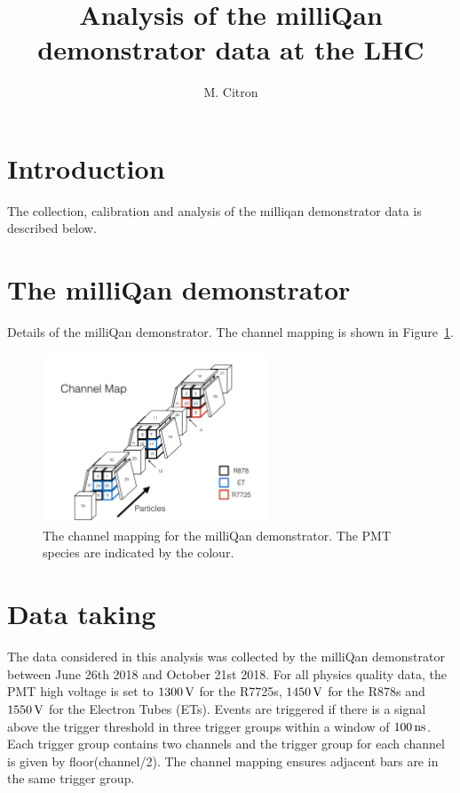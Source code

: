 \documentclass[12pt]{article}
\title{Analysis of the milliQan demonstrator data at the LHC}
\author{M. Citron}
\newcommand{\unit}[1]{\ensuremath{\text{\,#1}}\xspace}
\begin{document}
\maketitle

\section{Introduction}

The collection, calibration and analysis of the milliqan demonstrator data is described below.

\section{The milliQan demonstrator}

Details of the milliQan demonstrator. The channel mapping is shown in Figure~\ref{fig:channelMap}.

\begin{figure}
\centering
    \includegraphics[width=0.6\textwidth]{figures/channelMap}
    \caption{\label{fig:channelMap} The channel mapping for the milliQan demonstrator. 
    The PMT species are indicated by the colour.}
\end{figure}

\section{Data taking}

The data considered in this analysis was collected by the milliQan demonstrator between June 26th 2018 and October 21st 2018.
For all physics quality data, the PMT high voltage is set to $1300\unit{V}$ for the R7725s, $1450\unit{V}$ for the R878s
and $1550\unit{V}$ for the Electron Tubes (ETs). Events are triggered if there is a signal above the trigger threshold 
in three trigger groups within a window of $100\unit{ns}$. Each trigger group contains two channels and the trigger
group for each channel is given by floor(channel/2). The channel mapping ensures adjacent bars are in the same trigger group. 
\end{document}
